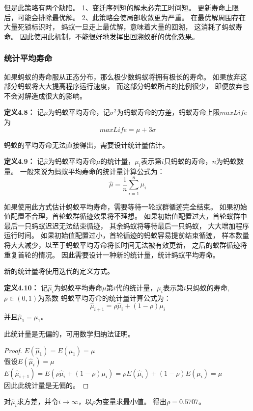 但是此策略有两个缺陷。
1、变迁序列短的解未必完工时间短。
更新寿命上限后，可能会排除最优解。
2、此策略会使局部收敛更为严重。
在最优解周围存在大量死锁标识时，
蚂蚁一旦走上最优解，意味着大量的回溯，
这消耗了蚂蚁寿命。
因此使用此机制，不能很好地发挥出回溯蚁群的优化效果。
\subsubsection{统计平均寿命}
如果蚂蚁的寿命服从正态分布，那么极少数蚂蚁将拥有极长的寿命。
如果放弃这部分蚂蚁将大大提高程序运行速度，
而这部分蚂蚁所占的比例很少，
即便放弃也不会对解造成很大的影响。

\textbf{定义4.8}\textbf{：}
记$\mu$为蚂蚁平均寿命，记$\sigma^{2}$为蚂蚁寿命的方差，蚂蚁寿命上限$maxLife$为
$$
maxLife=\mu+3\sigma
$$

蚂蚁的平均寿命无法直接得出，需要设计统计量估计。

\textbf{定义4.9}\textbf{：}
记$\widehat{\mu}$为蚂蚁平均寿命$\mu$的统计量，$\mu_{i}$表示第$i$只蚂蚁的寿命，$n$为蚂蚁数量。
一般来说为蚂蚁平均寿命的统计量计算公式为：
$$
	\widehat{\mu}=\frac{1}{n} \sum_{i = 1}^{n}  \mu_{i}
$$

如果使用此方式估计蚂蚁平均寿命，需要等待一轮蚁群循迹完全结束。
如果初始值配置不合理，首轮蚁群循迹效果将不理想。
如果初始值配置过大，首轮蚁群中最后一只蚂蚁迟迟无法结束循迹，
其余蚂蚁将等待最后一只蚂蚁，
大大增加程序运行时间。
如果初始值配置过小，首轮循迹的蚂蚁容易提前结束循迹，
样本数量将大大减少，以至于蚂蚁平均寿命将长时间无法被有效更新，
之后的蚁群循迹将重复首轮的情况。
因此需要设计一种新的统计量，统计蚂蚁平均寿命。

新的统计量将使用迭代的定义方式。

\textbf{定义4.10}\textbf{：}
记$\widehat{\mu}_{i}$为蚂蚁平均寿命$\mu$第$i$代的统计量，$\mu_{i}$表示第$i$只蚂蚁的寿命,$\rho \in (0,1)$为系数
蚂蚁平均寿命的统计量计算公式为：
$$
	\widehat{\mu}_{i+1}=\rho \widehat{\mu}_{i}+(1-\rho)\mu_{i}
$$
并且$\widehat{\mu}_{1}=\mu_{1}$。

此统计量是无偏的，可用数学归纳法证明。
\begin{proof}
	$E(\widehat{\mu}_{1})=E(\mu_{1})=\mu$\\
	假设$E(\widehat{\mu}_{i})=\mu$\\
	$E(\widehat{\mu}_{i+1})=E(\rho \widehat{\mu}_{i}+(1-\rho)\mu_{i})=\rho E(\widehat{\mu}_{i})+(1-\rho) E(\mu_{i})=\mu$\\
	因此此统计量是无偏的。
\end{proof}

对$\widehat{\mu}_{i}$求方差，并令$i \rightarrow \infty$，以$\rho$为变量求最小值。
得出$\rho=0.5707$。

